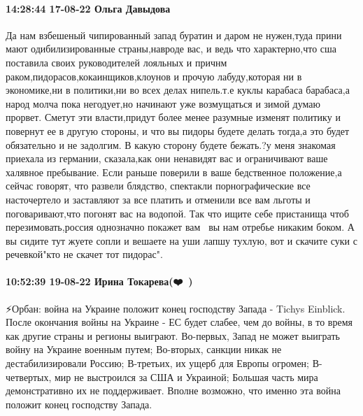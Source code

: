  
 
 
 
 

\paragraph{14:28:44 17-08-22 Ольга Давыдова}

Да нам взбешеный чипированный запад буратин и даром не нужен,туда прини мают
одибилизированные страны,навроде вас, и ведь что характерно,что сша поставила
своих руководителей лояльных и причнм раком,пидорасов,кокаинщиков,клоунов и
прочую лабуду,которая ни в экономике,ни в политики,ни во всех делах нипель.т.е
куклы карабаса барабаса,а народ молча пока негодует,но начинают уже возмущаться
и зимой думаю прорвет. Сметут эти власти,придут более менее разумные изменят
политику и повернут ее в другую стороны, и что вы пидоры будете делать тогда,а
это будет обязательно и не задолгим. В какую сторону будете бежать.?у меня
знакомая приехала из германии, сказала,как они ненавидят вас и ограничивают
ваше халявное пребывание. Если раньше поверили в ваше бедственное положение,а
сейчас говорят, что развели блядство, спектакли порнографические все
насточертело и заставляют за все платить и отменили все вам льготы и
поговаривают,что погонят вас на водопой. Так что ищите  себе пристанища чтоб
перезимовать,россия однозначно покажет вам💪💪💪вы нам отребье никаким боком. А
вы сидите тут жуете сопли и вешаете на уши лапшу тухлую, вот и скачите суки с
речевкой"кто не скачет тот пидорас".

\paragraph{10:52:39 19-08-22 Ирина Токарева(❤️💙🤍)}

⚡️Орбан: война на Украине положит конец господству Запада - Tichys Einblick.
После окончания войны на Украине - ЕС будет слабее, чем до войны, в то время как другие страны и регионы выиграют.
Во-первых, Запад не может выиграть войну на Украине военным путем;
Во-вторых, санкции никак не дестабилизировали Россию;
В-третьих, их ущерб для Европы огромен;
В-четвертых, мир не выстроился за США и Украиной;
Большая часть мира демонстративно их не поддерживает. Вполне возможно, что именно эта война положит конец господству Запада.
